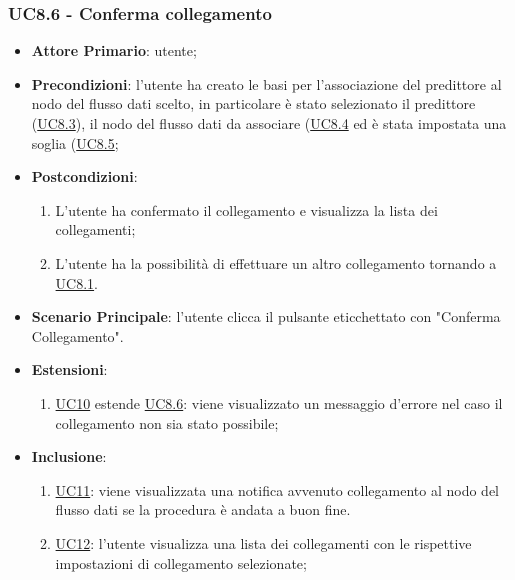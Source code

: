 	\subsubsection{UC8.6 - Conferma collegamento}
		\begin{itemize}
			\item\textbf{Attore Primario}: utente;
			\item\textbf{Precondizioni}: l’utente ha creato le basi per l'associazione del predittore al nodo del flusso dati scelto, in particolare è stato selezionato il predittore (\hyperref[par:UC8.3]{UC8.3}), il nodo del flusso dati da associare (\hyperref[par:UC8.4]{UC8.4} ed è stata impostata una soglia (\hyperref[par:UC8.5]{UC8.5};
			\item\textbf{Postcondizioni}: 
				\begin{enumerate}
					\item L’utente ha confermato il collegamento e visualizza la lista dei collegamenti;
					\item L'utente ha la possibilità di effettuare un altro collegamento tornando a \hyperref[par:UC8.1]{UC8.1}.
				\end{enumerate}

			\item\textbf{Scenario Principale}: l’utente clicca il pulsante eticchettato con "Conferma Collegamento".
			\item\textbf{Estensioni}:
				\begin{enumerate}
					\item\hyperref[par:UC10]{UC10} estende \hyperref[par:UC8.6]{UC8.6}: viene visualizzato un messaggio d’errore nel caso il collegamento non sia stato possibile;
				\end{enumerate}
			\item\textbf{Inclusione}: 
				\begin{enumerate}
					\item\hyperref[par:UC11]{UC11}: viene visualizzata una notifica avvenuto collegamento al nodo del flusso dati se la procedura è andata a buon fine.
					\item\hyperref[par:UC12]{UC12}:  l'utente visualizza una lista dei collegamenti con le rispettive impostazioni di collegamento selezionate;
				\end{enumerate}
		\end{itemize}

	
	

